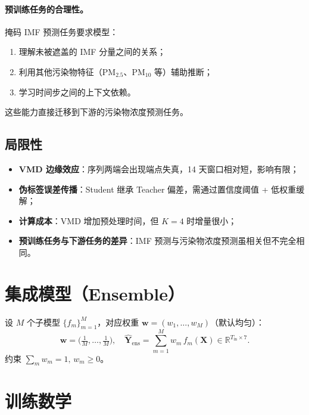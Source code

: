 \documentclass[11pt,a4paper]{article}
\newcommand{\R}{\mathbb{R}}
\newcommand{\mat}[1]{\bm{#1}}
\newcommand{\vect}[1]{\bm{#1}}
\begin{document}
\paragraph{预训练任务的合理性。}
掩码 IMF 预测任务要求模型：
\begin{enumerate}[leftmargin=*]
  \item 理解未被遮盖的 IMF 分量之间的关系；
  \item 利用其他污染物特征（PM$_{2.5}$、PM$_{10}$ 等）辅助推断；
  \item 学习时间步之间的上下文依赖。
\end{enumerate}
这些能力直接迁移到下游的污染物浓度预测任务。

\subsection{局限性}
\begin{itemize}[leftmargin=*]
  \item \textbf{VMD 边缘效应}：序列两端会出现端点失真，14 天窗口相对短，影响有限；
  \item \textbf{伪标签误差传播}：Student 继承 Teacher 偏差，需通过置信度阈值 + 低权重缓解；
  \item \textbf{计算成本}：VMD 增加预处理时间，但 $K=4$ 时增量很小；
  \item \textbf{预训练任务与下游任务的差异}：IMF 预测与污染物浓度预测虽相关但不完全相同。
\end{itemize}

\section{集成模型（Ensemble）}
设 $M$ 个子模型 $\{f_m\}_{m=1}^{M}$，对应权重 $\vect{w} = (w_1,\dots,w_M)$（默认均匀）：
\[
\vect{w} = \bigl(\tfrac{1}{M},\dots,\tfrac{1}{M}\bigr),\quad
\widehat{\mat{Y}}_{\text{ens}} = \sum_{m=1}^{M} w_m\, f_m(\mat{X}) \in \R^{T_{\text{in}}\times 7}.
\]
约束 $\sum_m w_m = 1,\, w_m \ge 0$。

\section{训练数学}
\end{document}
